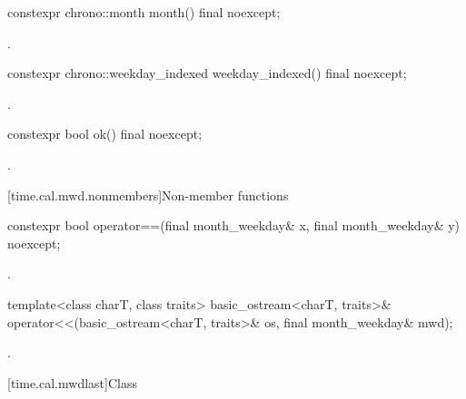 %
\begin{itemdecl}
constexpr chrono::month month() final noexcept;
\end{itemdecl}

\begin{itemdescr}
\pnum
\returns {}.
\end{itemdescr}

%
\begin{itemdecl}
constexpr chrono::weekday_indexed weekday_indexed() final noexcept;
\end{itemdecl}

\begin{itemdescr}
\pnum
\returns {}.
\end{itemdescr}

%
\begin{itemdecl}
constexpr bool ok() final noexcept;
\end{itemdecl}

\begin{itemdescr}
\pnum
\returns {}.
\end{itemdescr}

[time.cal.mwd.nonmembers]{Non-member functions}

%
\begin{itemdecl}
constexpr bool operator==(final month_weekday& x, final month_weekday& y) noexcept;
\end{itemdecl}

\begin{itemdescr}
\pnum
\returns {}.
\end{itemdescr}

%
\begin{itemdecl}
template<class charT, class traits>
  basic_ostream<charT, traits>&
    operator<<(basic_ostream<charT, traits>& os, final month_weekday& mwd);
\end{itemdecl}

\begin{itemdescr}
\pnum
\returns {}.
\end{itemdescr}

[time.cal.mwdlast]{Class }

